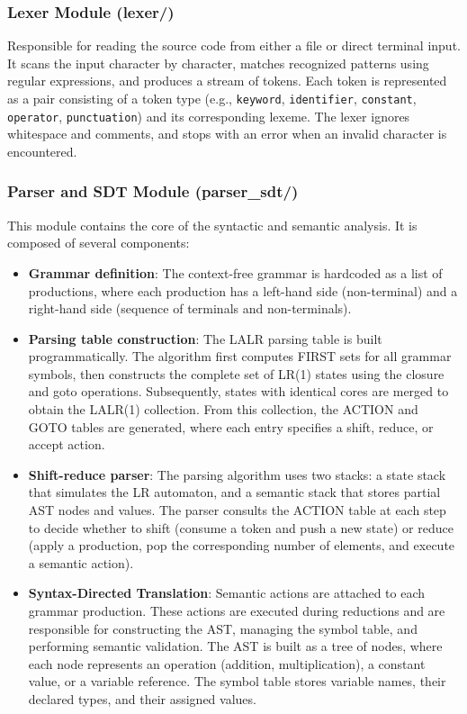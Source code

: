 \documentclass[letterpaper,12pt,oneside]{article}
\begin{document}
\subsubsection{Lexer Module (lexer/)}

Responsible for reading the source code from either a file or direct terminal input. It scans the input character by character, matches recognized patterns using regular expressions, and produces a stream of tokens. Each token is represented as a pair consisting of a token type (e.g., \texttt{keyword}, \texttt{identifier}, \texttt{constant}, \texttt{operator}, \texttt{punctuation}) and its corresponding lexeme. The lexer ignores whitespace and comments, and stops with an error when an invalid character is encountered.

\subsubsection{Parser and SDT Module (parser\_sdt/)}

This module contains the core of the syntactic and semantic analysis. It is composed of several components:

\begin{itemize}
	\item \textbf{Grammar definition}: The context-free grammar is hardcoded as a list of productions, where each production has a left-hand side (non-terminal) and a right-hand side (sequence of terminals and non-terminals).
	
	\item \textbf{Parsing table construction}: The LALR parsing table is built programmatically. The algorithm first computes FIRST sets for all grammar symbols, then constructs the complete set of LR(1) states using the closure and goto operations. Subsequently, states with identical cores are merged to obtain the LALR(1) collection. From this collection, the ACTION and GOTO tables are generated, where each entry specifies a shift, reduce, or accept action.
	
	\item \textbf{Shift-reduce parser}: The parsing algorithm uses two stacks: a state stack that simulates the LR automaton, and a semantic stack that stores partial AST nodes and values. The parser consults the ACTION table at each step to decide whether to shift (consume a token and push a new state) or reduce (apply a production, pop the corresponding number of elements, and execute a semantic action).
	
	\item \textbf{Syntax-Directed Translation}: Semantic actions are attached to each grammar production. These actions are executed during reductions and are responsible for constructing the AST, managing the symbol table, and performing semantic validation. The AST is built as a tree of nodes, where each node represents an operation (addition, multiplication), a constant value, or a variable reference. The symbol table stores variable names, their declared types, and their assigned values.
\end{itemize}
\end{document}
